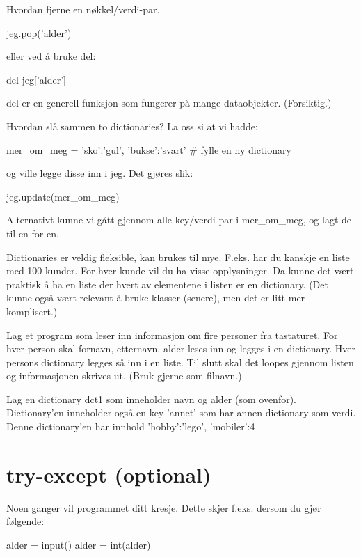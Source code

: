 Hvordan fjerne en nøkkel/verdi-par. 
\begin{usncodebox}
jeg.pop('alder')
\end{usncodebox}

eller ved å bruke del: 
\begin{usncodebox}
del jeg['alder']
\end{usncodebox}

del er en generell funksjon som fungerer på mange dataobjekter. (Forsiktig.) 

Hvordan slå sammen to dictionaries?
La oss si at vi hadde:
\begin{usncodebox}
mer_om_meg = {'sko':'gul', 'bukse':'svart'}   # fylle en ny dictionary
\end{usncodebox}
og ville legge disse inn i jeg. Det gjøres slik:
\begin{usncodebox}
jeg.update(mer_om_meg)
\end{usncodebox}
Alternativt kunne vi gått gjennom alle key/verdi-par i mer\_{}om\_{}meg, og lagt de til en for en.

Dictionaries er veldig fleksible, kan brukes til mye. F.eks. har du kanskje en liste med 100 kunder. For hver kunde vil du ha visse opplysninger. Da kunne det vært praktisk å ha en liste der hvert av elementene i listen er en dictionary. (Det kunne også vært relevant å bruke klasser (senere), men det er litt mer komplisert.)

\begin{exercise}
Lag et program som leser inn informasjon om fire personer fra tastaturet. For hver person skal fornavn, etternavn, alder leses inn og legges i en dictionary. Hver persons dictionary legges så inn i en liste. Til slutt skal det loopes gjennom listen og informasjonen skrives ut. (Bruk gjerne  som filnavn.)
\end{exercise} 

\begin{exercise}
Lag en dictionary dct1 som inneholder navn og alder (som ovenfor). Dictionary'en inneholder også en key 'annet' som har annen dictionary som verdi. Denne dictionary'en har innhold {'hobby':'lego', 'mobiler':4}
\end{exercise}

\section{try-except (optional)}

Noen ganger vil programmet ditt kresje. Dette skjer f.eks. dersom du gjør følgende:
\begin{usncodebox}
alder = input()
alder = int(alder)
\end{usncodebox}


